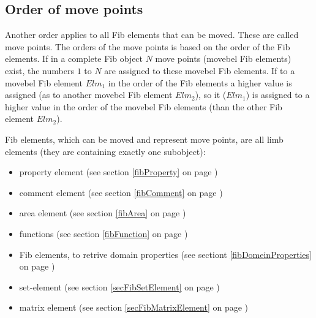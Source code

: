 \subsection{Order of move points}

Another order applies to all Fib elements that can be moved. These are called move points.
The orders of the move points is based on the order of the Fib elements. If in a complete Fib object $N$ move points (movebel Fib elements) exist, the numbers $1$ to $N$ are assigned to these movebel Fib elements. If to a movebel Fib element $Elm_1$ in the order of the Fib elements a higher value is assigned (as to another movebel Fib element $Elm_2$), so it ($Elm_1$) is assigned to a higher value in the order of the movebel Fib elements (than the other Fib element $Elm_2$).

\bigskip\noindent
Fib elements, which can be moved and represent move points, are all limb elements (they are containing exactly one subobject):
\begin{itemize}
 \item property element (see section \ref{fibProperty} on page \pageref{fibProperty})
 \item comment element (see section \ref{fibComment} on page \pageref{fibComment})
 \item area element (see section \ref{fibArea} on page \pageref{fibArea})
 \item functions (see section \ref{fibFunction} on page \pageref{fibFunction})
 \item Fib elements, to retrive domain properties (see sectiont \ref{fibDomeinProperties} on page \pageref{fibDomeinProperties})
 \item set-element (see section \ref{secFibSetElement} on page \pageref{secFibSetElement})
 \item matrix element (see section \ref{secFibMatrixElement} on page \pageref{secFibMatrixElement})
\end{itemize}

